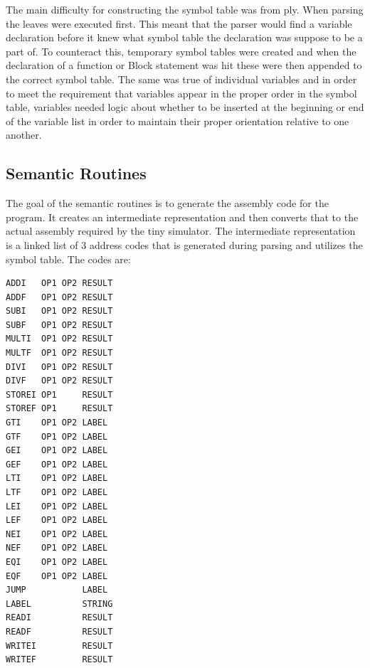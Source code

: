 \documentclass[12pt]{article}
\begin{document}
            The main difficulty for constructing the symbol table was from ply.  When parsing the leaves were executed first.  This meant that the parser would find a variable declaration before it knew what symbol table the declaration was suppose to be a part of.   To counteract this, temporary symbol tables were created and when the declaration of a function or Block statement was hit these were then appended to the correct symbol table.  The same was true of individual variables and in order to meet the requirement that variables appear in the proper order in the symbol table, variables needed logic about whether to be inserted at the beginning or end of the variable list in order to maintain their proper orientation relative to one another.

        \subsection{Semantic Routines}
            The goal of the semantic routines is to generate the assembly code for the program.
            It creates an intermediate representation and then converts that to the actual assembly required by the tiny simulator.
            The intermediate representation is a linked list of 3 address codes that is generated during parsing and utilizes the symbol table.
            The codes are:
            \begin{verbatim}
ADDI   OP1 OP2 RESULT
ADDF   OP1 OP2 RESULT
SUBI   OP1 OP2 RESULT
SUBF   OP1 OP2 RESULT
MULTI  OP1 OP2 RESULT
MULTF  OP1 OP2 RESULT
DIVI   OP1 OP2 RESULT
DIVF   OP1 OP2 RESULT
STOREI OP1     RESULT
STOREF OP1     RESULT
GTI    OP1 OP2 LABEL
GTF    OP1 OP2 LABEL
GEI    OP1 OP2 LABEL
GEF    OP1 OP2 LABEL
LTI    OP1 OP2 LABEL
LTF    OP1 OP2 LABEL
LEI    OP1 OP2 LABEL
LEF    OP1 OP2 LABEL
NEI    OP1 OP2 LABEL
NEF    OP1 OP2 LABEL
EQI    OP1 OP2 LABEL
EQF    OP1 OP2 LABEL
JUMP           LABEL
LABEL          STRING
READI          RESULT
READF          RESULT
WRITEI         RESULT
WRITEF         RESULT
            \end{verbatim}
\end{document}
